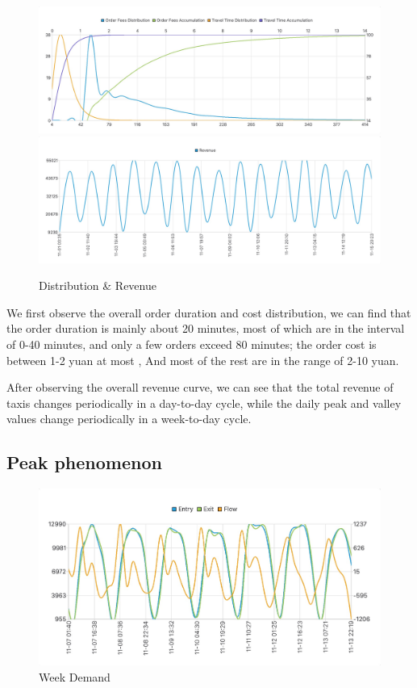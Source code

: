 \documentclass{article}
\begin{document}
\setlength{\parindent}{0em}
\begin{figure}[htbp] 
	\centering 
	\includegraphics[scale=0.15]{all_distribution.jpg}
	\includegraphics[scale=0.15]{new_all_revenue.jpg}
	\caption{Distribution \& Revenue}
\end{figure}
\setlength{\parindent}{2em}

We first observe the overall order duration and cost distribution, we can find that the order duration is mainly about 20 minutes, most of which are in the interval of 0-40 minutes, and only a few orders exceed 80 minutes; the order cost is between 1-2 yuan at most , And most of the rest are in the range of 2-10 yuan.

After observing the overall revenue curve, we can see that the total revenue of taxis changes periodically in a day-to-day cycle, while the daily peak and valley values ​​change periodically in a week-to-day cycle.

\subsection{Peak phenomenon}

\setlength{\parindent}{0em}
\begin{figure}[htbp] 
	\centering 
	\includegraphics[scale=0.25]{new_week_demand.jpg}
	\caption{Week Demand}
\end{figure}
\setlength{\parindent}{2em}
\end{document}
